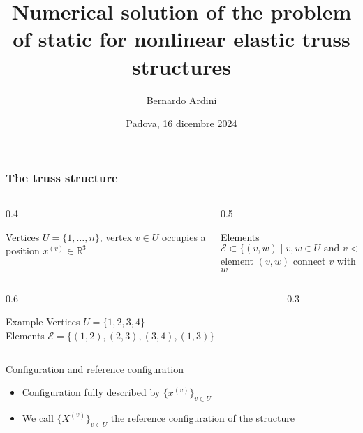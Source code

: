\documentclass[10pt]{beamer}
\title[]{Numerical solution of the problem of static for nonlinear elastic truss structures}
\author[]{Bernardo Ardini}
\date{Padova, 16 dicembre 2024}
\theoremstyle{definition}
\begin{document}
\begin{frame}
\maketitle
\end{frame}

\begin{frame}
\frametitle{The truss structure}

\begin{columns}
\begin{column}{0.4\framewidth}
\begin{block}{Vertices}
$U=\{1,\dots,n\}$, vertex $v\in U$ occupies a position $x^{(v)}\in\mathbb{R}^3$
\end{block}
\end{column}
\begin{column}{0.5\framewidth}
\begin{block}{Elements}
$\mathcal{E}\subset\{(v,w)\;|\;\text{$v,w\in U$ and $v<w$}\}$ \\
element $(v,w)$ connect $v$ with $w$
\end{block}
\end{column}
\end{columns}

\begin{columns}
\begin{column}{0.6\framewidth}
\begin{block}{Example}
Vertices $U=\{1,2,3,4\}$ \\
Elements $\mathcal{E}=\{(1,2),(2,3),(3,4),(1,3)\}$
\end{block}
\end{column}
\begin{column}{0.3\framewidth}
\begin{center}
\end{center}
\end{column}
\end{columns}

\begin{block}{Configuration and reference configuration}
\begin{itemize}
\item Configuration fully described by $\{x^{(v)}\}_{v\in U}$
\item We call $\{X^{(v)}\}_{v\in U}$ the reference configuration of the structure
\end{itemize}
\end{block}

\end{frame}
\end{document}
